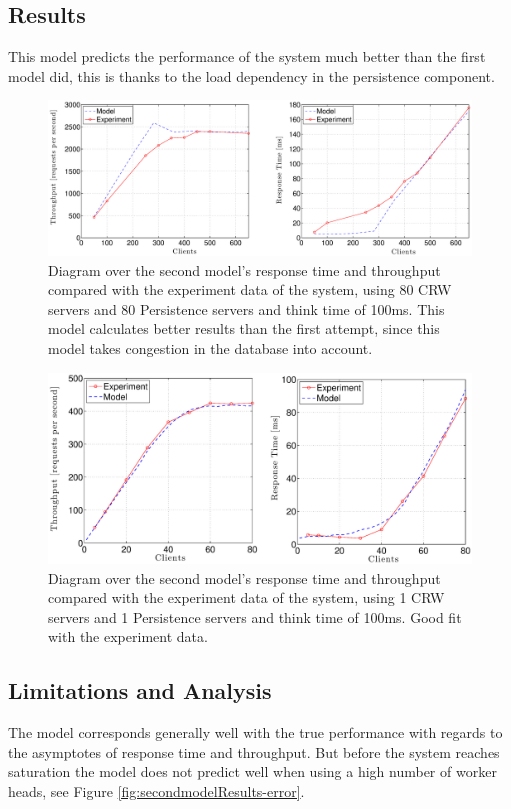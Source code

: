 \documentclass[a4paper, 11pt]{article}
\begin{document}
\subsection{Results}
	This model predicts the performance of the system much better than the first model did, this is thanks to the load dependency in the persistence component.
	\FloatBarrier
	\begin{figure}[cht!]
		\centering
			\includegraphics[width=1\linewidth,keepaspectratio]{secondRealAndModel}
		\caption{Diagram over the second model's response time and throughput compared with the experiment data of the system, using 80 CRW servers and 80 Persistence servers and think time of 100ms. This model calculates better results than the first attempt, since this model takes congestion in the database into account.}
		\label{fig:secondmodelResults}
	\end{figure}
	\FloatBarrier
	\begin{figure}[cht!]
		\centering
			\includegraphics[width=1\linewidth,keepaspectratio]{secondRealAndModel1Thread}
		\caption{Diagram over the second model's response time and throughput compared with the experiment data of the system, using 1 CRW servers and 1 Persistence servers and think time of 100ms. Good fit with the experiment data.}
		\label{fig:secondmodelResults-1-th}
	\end{figure}
	\FloatBarrier

	\subsection{Limitations and Analysis}
	The model corresponds generally well with the true performance with regards to the asymptotes of response time and throughput. But before the system reaches saturation the model does not predict well when using a high number of worker heads, see Figure \ref{fig:secondmodelResults-error}. 
\end{document}
